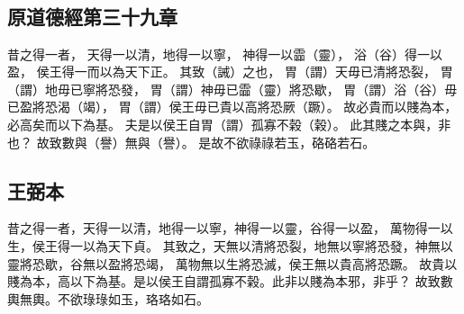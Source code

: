 ﻿%
%

\chapter{~}

\section{原道德經第三十九章}

\begin{withgezhu}

\zhsong


昔之得一者，
天得一以清，地得\colorbox{adding-color}{一}以寧，
神得一以霝（\textcolor{tongjia-color}{靈}），
浴（\textcolor{tongjia-color}{谷}）得一以盈，
侯\colorbox{adding-color}{王得一}而以為\colorbox{adding-color}{天下}正。
其致（\textcolor{tongjia-color}{誡}）之也，
胃（\textcolor{tongjia-color}{謂}）天毋已清將恐\colorbox{adding-color}{裂}，
胃（\textcolor{tongjia-color}{謂}）地毋\colorbox{adding-color}{已寧}將恐\colorbox{adding-color}{發}，
胃（\textcolor{tongjia-color}{謂}）神毋\colorbox{missing-color}{已霝（\textcolor{tongjia-color}{靈}）}\textcolor{wangbi-color}{將}\colorbox{adding-color}{恐歇}，
胃（\textcolor{tongjia-color}{謂}）浴（\textcolor{tongjia-color}{谷}）毋已\colorbox{missing-color}{盈}將恐渴（\textcolor{tongjia-color}{竭}），
胃（\textcolor{tongjia-color}{謂}）侯王毋已貴\colorbox{adding-color}{以高將恐厥（\textcolor{tongjia-color}{蹶}）}。
故必貴而以賤為本，必高矣而以下為基。
夫是以侯王自胃（\textcolor{tongjia-color}{謂}）孤寡不榖（\textcolor{tongjia-color}{榖}）。
此其\colorbox{adding-color}{賤之本與，非也}？
故致數與（\textcolor{tongjia-color}{譽}）無與（\textcolor{tongjia-color}{譽}）。
是故不欲\colorbox{adding-color}{祿祿}若玉，硌\colorbox{adding-color}{硌若石}。

\end{withgezhu}

\section{王弼本}

\begin{withgezhu}

\zhsong

昔之得一者，天得一以清，地得一以寧，神得一以靈，谷得一以盈，
萬物得一以生，侯王得一以為天下貞。
其致之，天無以清將恐裂，地無以寧將恐發，神無以靈將恐歇，谷無以盈將恐竭，
萬物無以生將恐滅，侯王無以貴高將恐蹶。
故貴以賤為本，高以下為基。是以侯王自謂孤寡不榖。此非以賤為本邪，非乎？
故致數輿無輿。不欲琭琭如玉，珞珞如石。

\end{withgezhu}
